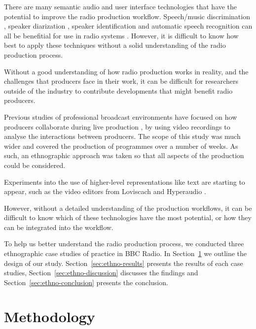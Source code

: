 
There are many semantic audio and user interface technologies that have the potential to improve the radio production
workflow. Speech/music discrimination \citep{Wieser2014}, speaker diarization \citep{AngueraMiro2012}, speaker
identification \citep{Lee1999a} and automatic speech recognition \citep{Junqua1995} can all be benefitial for use in
radio systems \citep{Raimond2014,Bell2015}. However, it is difficult to know how best to apply these techniques without
a solid understanding of the radio production process.

Without a good understanding of how radio production works in reality, and the challenges that producers face in their
work, it can be difficult for researchers outside of the industry to contribute developments that might benefit radio
producers.

Previous studies of professional broadcast environments have focused on how producers collaborate during live
production \citep{Engstroem2010,Perry2009}, by using video recordings to analyse the interactions between producers.
The scope of this study was much wider and covered the production of programmes over a number of weeks. As such, an
ethnographic approach was taken so that all aspects of the production could be considered.

Experiments into the use of higher-level representations like text are starting to appear, such as the video editors
from Loviscach \citep{Loviscach2011a} and Hyperaudio \citep{Boas2011}.

However, without a detailed understanding of the production workflows, it can be difficult to know which of these
technologies have the most potential, or how they can be integrated into the workflow.

To help us better understand the radio production process, we conducted three ethnographic case studies of practice in
BBC Radio.
In Section~\ref{sec:ethno-method} we outline the design of our study.
Section~\ref{sec:ethno-results} presents the results of each case studies,
Section~\ref{sec:ethno-discussion} discusses the findings and
Section~\ref{sec:ethno-conclusion} presents the conclusion.

\section{Methodology}\label{sec:ethno-method}

